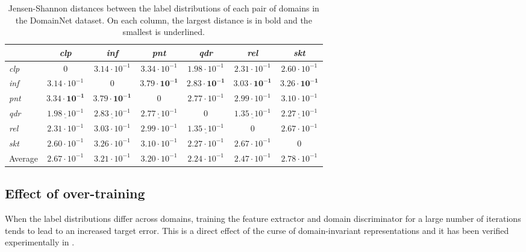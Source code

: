\begin{table}
	\centering
	\small
	\hspace*{-0.50in}
	\begin{tabular}{l|cccccc}
		& \textit{clp}                & \textit{inf}              & \textit{pnt} & \textit{qdr} & \textit{rel} & \textit{skt} \\ \hline
		\textit{clp} & $0$ & $3.14 \cdot 10^{-1}$ & $3.34 \cdot 10^{-1}$     & $1.98 \cdot 10^{-1}$ & $2.31 \cdot 10^{-1}$ & $2.60 \cdot 10^{-1}$         \\
		\textit{inf} & $3.14 \cdot 10^{-1}$ & $0$ & $\boldsymbol{3.79 \cdot 10^{-1}}$ & $\boldsymbol{2.83 \cdot 10^{-1}}$ & $\boldsymbol{3.03 \cdot 10^{-1}}$ & $\boldsymbol{3.26 \cdot 10^{-1}}$ \\
		\textit{pnt} & $\boldsymbol{3.34 \cdot 10^{-1}}$ & $\boldsymbol{3.79 \cdot 10^{-1}}$ & $0$ & $2.77 \cdot 10^{-1}$ & $2.99 \cdot 10^{-1}$ & $3.10 \cdot 10^{-1}$ \\
		\textit{qdr} & $\underline{1.98 \cdot 10^{-1}}$ & $\underline{2.83 \cdot 10^{-1}}$ & $\underline{2.77 \cdot 10^{-1}}$ & $0$ & $\underline{1.35 \cdot 10^{-1}}$ & $\underline{2.27 \cdot 10^{-1}}$ \\
		\textit{rel}  & $2.31 \cdot 10^{-1}$ & $3.03 \cdot 10^{-1}$ & $2.99 \cdot 10^{-1}$ & $\underline{1.35 \cdot 10^{-1}}$ & $0$ & $2.67 \cdot 10^{-1}$ \\
		\textit{skt}  & $2.60 \cdot 10^{-1}$ & $3.26 \cdot 10^{-1}$ & $3.10 \cdot 10^{-1}$ & $2.27 \cdot 10^{-1}$ & $2.67 \cdot 10^{-1}$ & $0$ \\ \hline
		Average & $2.67 \cdot 10^{-1}$ & $3.21 \cdot 10^{-1}$ & $3.20 \cdot 10^{-1}$ & $2.24 \cdot 10^{-1}$ & $2.47 \cdot 10^{-1}$ & $2.78 \cdot 10^{-1}$ \\
	\end{tabular}
	\caption{Jensen-Shannon distances between the label distributions of each pair of domains in the DomainNet dataset. On each column, the largest distance is in bold and the smallest is underlined.}
	\label{tab:domainnet_js}
\end{table}

\subsection{Effect of over-training}
\label{sec:overtrain}
When the label distributions differ across domains, training the feature extractor and domain discriminator for a large number of iterations tends to lead to an increased target error. This is a direct effect of the curse of domain-invariant representations and it has been verified experimentally in \cite{Zhao2019}.

